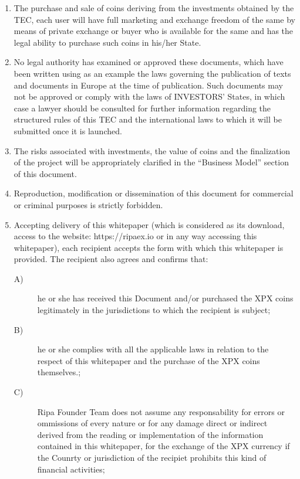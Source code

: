 \begin{scriptsize}
{\begin{enumerate}
			Individuals that have access to the whitepaper should consult his/her advisor of trust before
			conducting any financial activity in the RipaEx project.
			\item The purchase and sale of coins deriving from the investments obtained by the TEC, each user will
			have full marketing and exchange freedom of the same by	means of private exchange or buyer who is available for
			the same and has the legal ability to purchase such coins in his/her State.
			\item No legal authority has examined or approved these documents, which have been written using 
			as an example the laws governing the publication of texts and documents in Europe at the time of publication. 
			Such documents may not be approved or comply with the laws of INVESTORS’ States, in which case a lawyer 
			should be consulted for	further information regarding the structured rules of this TEC and the international 
			laws to which it will be submitted once it is launched.
			\item The risks associated with investments, the value of coins	and the finalization of the project will be 
			appropriately clarified in the ``Business Model'' section of this document.
			\item Reproduction, modification or dissemination of this document for commercial or criminal purposes is strictly
			forbidden.
			\item Accepting delivery of this whitepaper (which is considered as its download, access to the website: 
			https://ripaex.io or in any way accessing this whitepaper), each recipient accepts the form with which this 
			whitepaper is provided.	The recipient also agrees and confirms that:
			\begin{description}
				\item[A)] he or she has received this Document and/or purchased	the XPX coins legitimately in the 
				jurisdictions to which the recipient is subject;
				\item[B)] he or she complies with all the applicable laws in relation to the respect of this whitepaper 
				and the purchase of the XPX coins themselves.;
				\item[C)] Ripa Founder Team does not assume any responsability for errors or ommissions of every nature
				or for any damage direct or indirect derived from the reading or implementation of the information
				contained in this whitepaper, for the exchange of the XPX currency if the Counrty or jurisdiction of 
				the recipiet prohibits this kind of financial activities;

\end{description}
\end{enumerate}}
\end{scriptsize}
